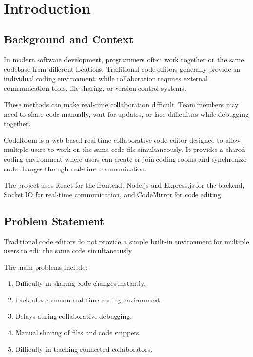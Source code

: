 \documentclass[12pt,a4paper,oneside]{report}
\begin{document}
\tableofcontents
\newpage
{}

\chapter{Introduction}

\section{Background and Context}

In modern software development, programmers often work together on the same codebase from different locations. Traditional code editors generally provide an individual coding environment, while collaboration requires external communication tools, file sharing, or version control systems.

These methods can make real-time collaboration difficult. Team members may need to share code manually, wait for updates, or face difficulties while debugging together.

CodeRoom is a web-based real-time collaborative code editor designed to allow multiple users to work on the same code file simultaneously. It provides a shared coding environment where users can create or join coding rooms and synchronize code changes through real-time communication.

The project uses React for the frontend, Node.js and Express.js for the backend, Socket.IO for real-time communication, and CodeMirror for code editing.

\section{Problem Statement}

Traditional code editors do not provide a simple built-in environment for multiple users to edit the same code simultaneously.

The main problems include:

\begin{enumerate}
    \item Difficulty in sharing code changes instantly.
    \item Lack of a common real-time coding environment.
    \item Delays during collaborative debugging.
    \item Manual sharing of files and code snippets.
    \item Difficulty in tracking connected collaborators.
\end{enumerate}
\end{document}

